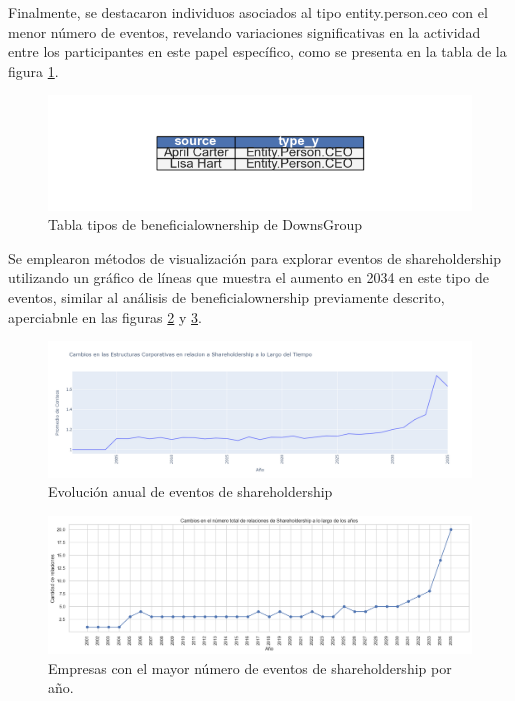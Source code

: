 \documentclass[11pt,spanish,a4paper]{article}
\begin{document}
Finalmente, se destacaron individuos asociados al tipo entity.person.ceo con el menor número de eventos, revelando variaciones significativas en la actividad entre los participantes en este papel específico, como se presenta en la tabla de la figura \ref{fig:person_ceo_ownership}.

\begin{figure}[H]
  \centering
  \includegraphics[width=0.7\linewidth]{graphs/person_ceo_ownership_downs.png}
  \caption{Tabla tipos de beneficialownership de DownsGroup}
  \label{fig:person_ceo_ownership}
\end{figure}

\break


Se emplearon métodos de visualización para explorar eventos de shareholdership utilizando un gráfico de líneas que muestra el aumento en 2034 en este tipo de eventos, similar al análisis de beneficialownership previamente descrito, aperciabnle en las figuras \ref{fig:shareholdership_2001_2035} y \ref{fig:shareholdership_top_anio_v2}.

\begin{figure}[H]
  \centering
  \includegraphics[width=0.7\linewidth]{graphs/promedio_cambio_shareholdership.png}
  \caption{Evolución anual de eventos de shareholdership}
  \label{fig:shareholdership_2001_2035}
\end{figure}

\begin{figure}[H]
  \centering
  \includegraphics[width=0.7\linewidth]{graphs/dispersion_sharedholdership_top_anio_v2.png}
  \caption{Empresas con el mayor número de eventos de shareholdership por año.}
  \label{fig:shareholdership_top_anio_v2}
\end{figure}
\end{document}
